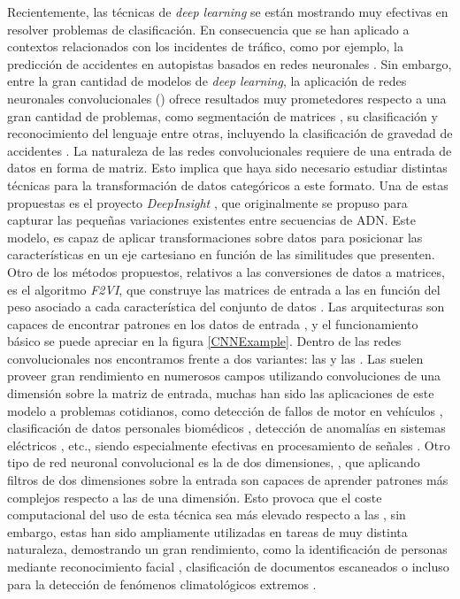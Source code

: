 Recientemente, las técnicas de \textit{deep learning} se están mostrando muy efectivas en resolver problemas de clasificación. En consecuencia que se han aplicado a contextos relacionados con los incidentes de tráfico, como por ejemplo, la predicción de accidentes en autopistas basados en redes neuronales \cite{RedNeuronalAutopistaAccidentes}. Sin embargo, entre la gran cantidad de modelos de \textit{deep learning}, la aplicación de redes neuronales convolucionales () ofrece resultados muy prometedores respecto a una gran cantidad de problemas, como segmentación de matrices \cite{ImageSegmentationCNNEA}, su clasificación \cite{ImageClassificationCNNEA} y reconocimiento del lenguaje \cite{LanguageRecognitionCNNEA} entre otras, incluyendo la clasificación de gravedad de accidentes \cite{OtraPrediccionConCNNs}. La naturaleza de las redes convolucionales requiere de una entrada de datos en forma de matriz. Esto implica que haya sido necesario estudiar distintas técnicas para la transformación de datos categóricos a este formato. Una de estas propuestas es el proyecto \textit{DeepInsight} \cite{DeepInsight}, que originalmente se propuso para capturar las pequeñas variaciones existentes entre secuencias de ADN. Este modelo, es capaz de aplicar transformaciones sobre datos para posicionar las características en un eje cartesiano en función de las similitudes que presenten. Otro de los métodos propuestos, relativos a las conversiones de datos a matrices, es el algoritmo \textit{F2VI}, que construye las matrices de entrada a las  en función del peso asociado a cada característica del conjunto de datos \cite{TASPCNN}. Las arquitecturas  son capaces de encontrar patrones en los datos de entrada \cite{CNNReviews}, y el funcionamiento básico se puede apreciar en la figura \eqref{CNNExample}. Dentro de las redes convolucionales nos encontramos frente a dos variantes: las  y las . Las  suelen proveer gran rendimiento en numerosos campos utilizando convoluciones de una dimensión sobre la matriz de entrada, muchas han sido las aplicaciones de este modelo a problemas cotidianos, como detección de fallos de motor en vehículos \cite{MotorFailureCNN1D}, clasificación de datos personales biomédicos \cite{CNN1DMedicalSignalEA}, detección de anomalías en sistemas eléctricos \cite{ElectricSystemFailureCNN1D}, etc., siendo especialmente efectivas en procesamiento de señales \cite{Conv1D_Survey}. Otro tipo de red neuronal convolucional es la de dos dimensiones, , que aplicando filtros de dos dimensiones sobre la entrada son capaces de aprender patrones más complejos respecto a las de una dimensión. Esto provoca que el coste computacional del uso de esta técnica sea más elevado respecto a las , sin embargo, estas han sido ampliamente utilizadas en tareas de muy distinta naturaleza, demostrando un gran rendimiento, como la identificación de personas mediante reconocimiento facial \cite{FaceRecognitionCNN2EA}, clasificación de documentos escaneados \cite{DocumentAnalysisCNN2DEA} o incluso para la detección de fenómenos climatológicos extremos \cite{WeatherClimateCNN2DEA}.

